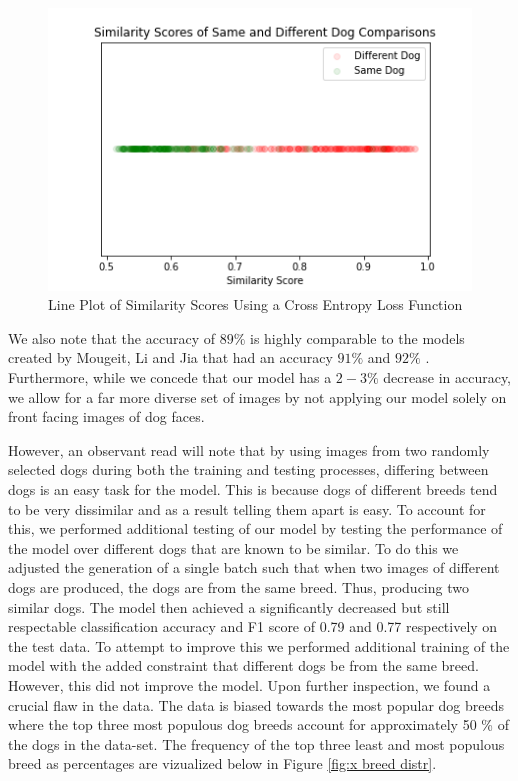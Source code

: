 \documentclass{article}
\begin{document}
\begin{figure}[h]
\centering
	\includegraphics[scale=0.7]{final-report-images/crossentropy_lineplot.png}
\caption{Line Plot of Similarity Scores Using a Cross Entropy Loss Function}
\label{fig:x triplet lineplot 2}
\end{figure}
\noident We also note that the accuracy of $89\%$ is highly comparable to the models created by Mougeit, Li and Jia that had an accuracy $91\%$ and $92\%$ \cite{MougeotGuillaume2019ADLA}.  Furthermore, while we concede that our model has a $2-3\%$ decrease in accuracy, we allow for a far more diverse set of images by not applying our model solely on front facing images of dog faces.

However, an observant read will note that by using images from two randomly selected dogs during both the training and testing processes, differing between dogs is an easy task for the model.  This is because dogs of different breeds tend to be very dissimilar and as a result telling them apart is easy.  To account for this, we performed additional testing of our model by testing the performance of the model over different dogs that are known to be similar.  To do this we adjusted the generation of a single batch such that when two images of different dogs are produced, the dogs are from the same breed.  Thus, producing two similar dogs.  The model then achieved a significantly decreased but still respectable classification accuracy and F1 score of 0.79 and 0.77 respectively on the test data.   To attempt to improve this we performed additional training of the model with the added constraint that different dogs be from the same breed.  However, this did not improve the model.  Upon further inspection, we found a crucial flaw in the data.  The data is biased towards the most popular dog breeds where the top three most populous dog breeds account for approximately 50 \% of the dogs in the data-set.  The frequency of the top three least and most populous breed as percentages are vizualized below in Figure \ref{fig:x breed distr}.
\end{document}
